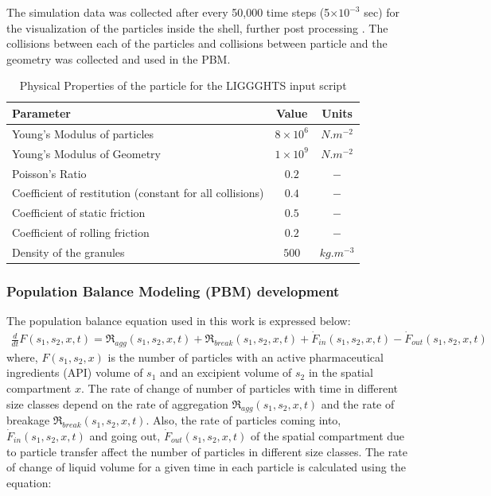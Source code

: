 \documentclass[preprint,11pt,authoryear]{elsarticle}
\begin{document}
The simulation data was collected after every 50,000 time steps (5$\times 10^{-3}$ sec) 
for the visualization of the particles inside the shell, further post processing . The collisions 
between each of the particles and collisions between particle and the geometry was 
collected and used in the PBM. 

\begin{table}
\caption{Physical Properties of the particle for the LIGGGHTS input script} 
\label{table:mthds_dem_input}
\begin{center}
\begin{tabular}{l|c|c}
\hline
\bf{Parameter} &\bf{Value} &\bf{Units}\\
\hline
Young's Modulus of particles  & $8 \times 10^{6}$ & $N.m^{-2}$\\
Young's Modulus of Geometry  & $1 \times 10^{9}$ & $N.m^{-2}$\\
Poisson's Ratio & $0.2$ & $-$\\
Coefficient of restitution (constant for all collisions) & $0.4$ & $-$\\
Coefficient of static friction & $0.5$ & $-$\\
Coefficient of rolling friction  & $0.2$ & $-$\\
Density of the granules & $500$ & $kg.m^{-3}$\\
\hline
\end{tabular}
\end{center}
\end{table}

\subsubsection{Population Balance Modeling (PBM) development}
\label{sec:pbm_model}
 The population balance equation used in this work is expressed below:
\begin{align}
\frac{d}{dt}F(s_1,s_2,x,t)=\Re_{agg}(s_1,s_2,x,t)+\Re_{break}(s_1,s_2,x,t)+
\dot{F}_{in}(s_1,s_2,x,t)-\dot{F}_{out}(s_1,s_2,x,t)
\label{eqn:mthds_pbm_overall} 
\end{align}
where, $F(s_1,s_2,x)$ is the number of particles with an active pharmaceutical ingredients 
(API) volume of $s_1$ and an excipient 
volume of $s_2$ in the spatial compartment $x$. The rate of change of number of particles with time 
in different size classes depend on the rate of aggregation $\Re_{agg}(s_1,s_2,x,t)$ and the rate of 
breakage $\Re_{break}(s_1,s_2,x,t)$. Also, the rate of particles coming into, $\dot{F}_{in}(s_1,s_2,x,t)$ and 
going out, $\dot{F}_{out}(s_1,s_2,x,t)$ of the spatial compartment due to particle transfer affect the 
number of particles in different size classes. 
The rate of change of liquid volume for a given time in each particle is calculated using the equation: 
\end{document}
